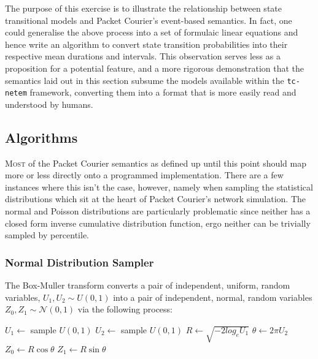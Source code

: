 The purpose of this exercise is to illustrate the relationship between state transitional models and Packet Courier's
event-based semantics. In fact, one could generalise the above process into a set of formulaic linear equations and
hence write an algorithm to convert state transition probabilities into their respective mean durations and
intervals. This observation serves less as a proposition for a potential feature, and a more rigorous demonstration
that the semantics laid out in this section subsume the models available within the \texttt{tc-netem} framework,
converting them into a format that is more easily read and understood by humans.

\newpage

\subsection{Algorithms}\label{subsection:algorithms}

\lettrine{M}{ost} of the Packet Courier semantics as defined up until this point should map more or less directly onto a
programmed implementation. There are a few instances where this isn't the case, however, namely when sampling the
statistical distributions which sit at the heart of Packet Courier's network simulation. The normal and Poisson
distributions are particularly problematic since neither has a closed form inverse cumulative distribution function,
ergo neither can be trivially sampled by percentile.

\subsubsection{Normal Distribution Sampler}\label{subsubsection:normal_distribution_sampler}

The Box-Muller transform converts a pair of independent, uniform, random variables, $U_1, U_2 \sim U(0, 1)$ into a pair
of independent, normal, random variables $Z_0, Z_1 \sim \mathcal{N}(0, 1)$\cite{box_muller_transform} via the
following process: \\

\begin{algorithm}[caption={Box-Muller Transform\cite{box_muller_transform}.},label={alg:box_muller_transform},
    captionpos=b]
    $U_1 \gets$ sample $U(0, 1)$
    $U_2 \gets$ sample $U(0, 1)$
    $R \gets \sqrt{-2 log_e U_1}$
    $\theta \gets 2 \pi U_2$
    $Z_0 \gets R \cos \theta$
    $Z_1 \gets R \sin \theta$
\end{algorithm}

